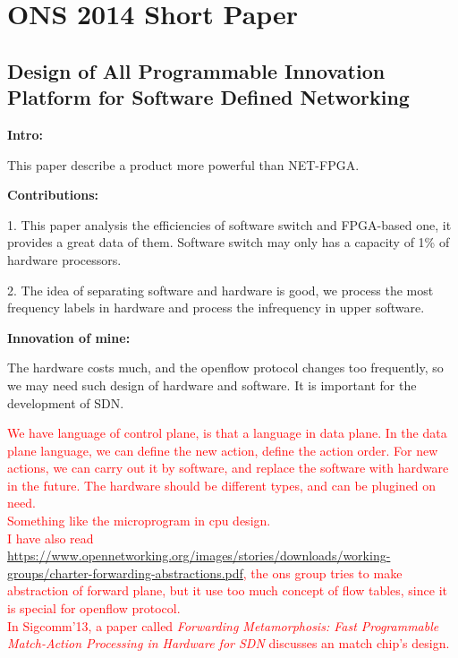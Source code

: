 %
%
%

\chapter{ONS 2014 Short Paper}
\label{intro} %

\section{Design of All Programmable Innovation Platform for Software Defined Networking}
\label{sec:1}
\textbf{Intro:}

This paper describe a product more powerful than NET-FPGA.

\noindent
\textbf{Contributions:}

1. This paper analysis the efficiencies of software switch and FPGA-based one, it provides a great data of them. Software switch may only has a capacity of 1\% of hardware processors.

2. The idea of separating software and hardware is good, we process the most frequency labels in hardware and process the infrequency in upper software. 

\noindent
\textbf{Innovation of mine:}

The hardware costs much, and the openflow protocol changes too frequently, so we may need such design of hardware and software. It is important for the development of SDN.

\textcolor{red}{We have language of control plane, is that a language in data plane. In the data plane language, we can define the new action, define the action order. For new actions, we can carry out it by software, and replace the software with hardware in the future. The hardware should be different types, and can be plugined on need.\\
\indent
Something like the microprogram in cpu design.\\
\indent
I have also read \url{https://www.opennetworking.org/images/stories/downloads/working-groups/charter-forwarding-abstractions.pdf}, the ons group tries to make abstraction of forward plane, but it use too much concept of flow tables, since it is special for openflow protocol.\\
\indent
In Sigcomm'13, a paper called \emph{Forwarding Metamorphosis: Fast Programmable Match-Action Processing in Hardware for SDN} discusses an match chip's design.
} 

